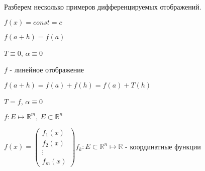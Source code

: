 
Разберем несколько примеров дифференцируемых отображений.

\begin{example} \thmslashn

    $f(x) = const = c$ 

    $f(a + h) = f(a)$

    $T \equiv 0$, $\alpha \equiv 0$

\end{example}

\begin{example} \thmslashn

    $f$ - линейное отображение

    $f(a + h) = f(a) + f(h) = f(a) + T(h)$

    $T = f$, $\alpha \equiv 0$ 

\end{example}

\begin{definition} \thmslashn

    $f: E \mapsto \mathbb{R}^m, \ E \subset \mathbb{R}^n$

    $
        f(x) = 
        \begin{pmatrix}
            f_1(x)\\
            f_2(x)\\
            \vdots\\
            f_m(x)
        \end{pmatrix}
     f_k:  E \subset \mathbb{R}^n \mapsto \mathbb{R}$ - координатные функции


\end{definition}


